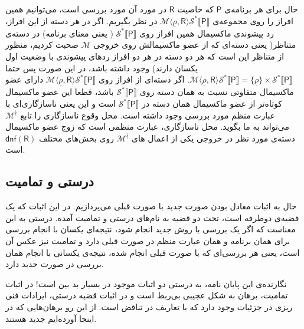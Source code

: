 حال برای هر برنامه‌ی $\mathsf{P}$ که خاصیت $\mathsf{R}$ در مورد آن مورد بررسی است، می‌توانیم همین افراز را روی مجموعه‌ی 
$\mathcal{M} \langle \underline{\rho}, \mathsf{R} \rangle \mathcal{S}^* \llbracket \mathsf{P} \rrbracket$
در نظر بگیریم. اگر در هر دسته از این افراز، رد پیشوندی ماکسیمال همین افراز روی 
$\mathcal{S}^* \llbracket \mathsf{P} \rrbracket$
( یعنی معنای برنامه) در دسته‌ی متناظر( یعنی دسته‌ای که از عضو ماکسیمالش روی خروجی $\mathcal{M}$ صحبت کردیم، منظور از متناظر این است که هر دو دسته در هر دو افراز ردهای پیشوندی با وضعیت اول یکسان دارند) وجود داشته باشد، در این صورت پس حتما 
$\mathcal{M} \langle \underline{\rho}, \mathsf{R} \rangle \mathcal{S}^* \llbracket \mathsf{P} \rrbracket =\{\underline{\rho}\} \times \mathcal{S}^* \llbracket \mathsf{P} \rrbracket$.
اگر دسته‌ای از افراز روی 
$\mathcal{M} \langle \underline{\rho}, \mathsf{R} \rangle \mathcal{S}^* \llbracket \mathsf{P} \rrbracket$
دارای عضو ماکسیمال متفاوتی نسبت به همان دسته روی 
$\mathcal{S}^* \llbracket \mathsf{P} \rrbracket$
باشد، قطعا این عضو ماکسیمال کوتاه‌تر از عضو ماکسیمال همان دسته در 
$\mathcal{S}^* \llbracket \mathsf{P} \rrbracket$
است و این یعنی ناسازگاری‌ای با عبارت منظم مورد بررسی وجود داشته است. محل وقوع ناسازگاری را تابع  
$\mathcal{M}^\nmid$
می‌تواند به ما بگوید. محل ناسازگاری، عبارت منظمی است که زوج عضو ماکسیمال دسته‌ی مورد نظر در خروجی یکی از اعمال های 
$\mathcal{M}^\nmid$
روی بخش‌های مختلف 
$\mathsf{dnf(R)}$
است. 




\subsection{درستی و تمامیت}
حال به اثبات معادل بودن صورت جدید با صورت قبلی می‌پردازیم. در \cite{calcul} این اثبات که یک قضیه‌ی دوطرفه است، تحت دو قضیه به نام‌های درستی و تمامیت آمده. درستی به این معناست که اگر یک بررسی با روش جدید انجام شود، نتیجه‌ای یکسان با انجام بررسی برای همان برنامه و همان عبارت منظم در صورت قبلی دارد و تمامیت نیز عکس آن است، یعنی هر بررسی‌ای که با صورت قبلی انجام شده، نتیجه‌ی یکسانی با انجام همان بررسی در صورت جدید دارد.

نگارنده‌ی این پایان نامه، به درستی دو اثبات موجود در \cite{calcul} بسیار بد بین است! در اثبات تمامیت، برهان به شکل عجیبی بی‌ربط است و در اثبات قضیه درستی، ایرادات فنی ریزی در جزئیات وجود دارد که با تعاریف در تناقض است. از این رو برهان‌هایی که در اینجا آورده‌ایم جدید هستند.

